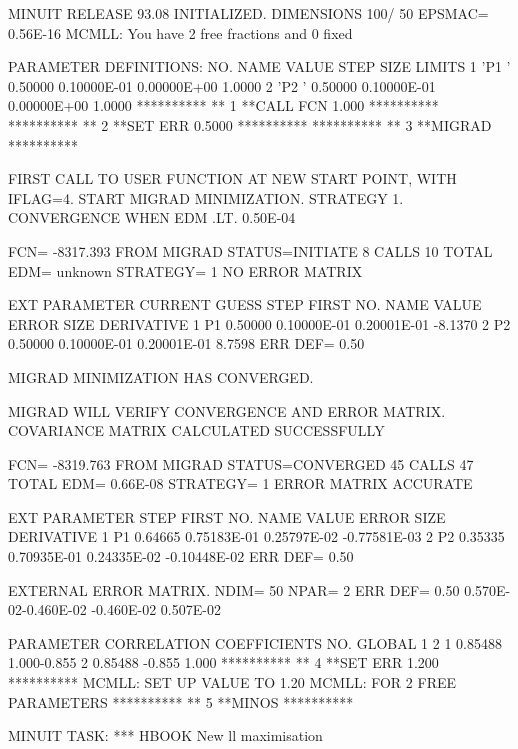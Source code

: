 \begin{changebar}
\begin{Listing}
{  MINUIT RELEASE 93.08  INITIALIZED.   DIMENSIONS 100/ 50  EPSMAC=  0.56E-16
 MCMLL: You have  2 free fractions and  0 fixed
 
 PARAMETER DEFINITIONS:
    NO.   NAME         VALUE      STEP SIZE      LIMITS
     1 'P1        '   0.50000      0.10000E-01    0.00000E+00   1.0000
     2 'P2        '   0.50000      0.10000E-01    0.00000E+00   1.0000
 **********
 **    1 **CALL FCN   1.000
 **********
 **********
 **    2 **SET ERR  0.5000
 **********
 **********
 **    3 **MIGRAD
 **********
 
 FIRST CALL TO USER FUNCTION AT NEW START POINT, WITH IFLAG=4.
 START MIGRAD MINIMIZATION.  STRATEGY 1.  CONVERGENCE WHEN EDM .LT. 0.50E-04
 
 FCN=  -8317.393     FROM MIGRAD    STATUS=INITIATE       8 CALLS       10 TOTAL
                     EDM= unknown      STRATEGY= 1      NO ERROR MATRIX
 
  EXT PARAMETER               CURRENT GUESS       STEP         FIRST
  NO.   NAME        VALUE          ERROR          SIZE      DERIVATIVE
   1      P1       0.50000       0.10000E-01   0.20001E-01   -8.1370
   2      P2       0.50000       0.10000E-01   0.20001E-01    8.7598
                               ERR DEF=  0.50
 
 MIGRAD MINIMIZATION HAS CONVERGED.
 
 MIGRAD WILL VERIFY CONVERGENCE AND ERROR MATRIX.
 COVARIANCE MATRIX CALCULATED SUCCESSFULLY
 
 FCN=  -8319.763     FROM MIGRAD    STATUS=CONVERGED     45 CALLS       47 TOTAL
                     EDM=  0.66E-08    STRATEGY= 1      ERROR MATRIX ACCURATE
 
  EXT PARAMETER                                   STEP         FIRST
  NO.   NAME        VALUE          ERROR          SIZE      DERIVATIVE
   1      P1       0.64665       0.75183E-01   0.25797E-02  -0.77581E-03
   2      P2       0.35335       0.70935E-01   0.24335E-02  -0.10448E-02
                               ERR DEF=  0.50
 
 EXTERNAL ERROR MATRIX.    NDIM=  50    NPAR=  2    ERR DEF=  0.50
  0.570E-02-0.460E-02
 -0.460E-02 0.507E-02
 
 PARAMETER  CORRELATION COEFFICIENTS
       NO.  GLOBAL     1     2
        1  0.85488  1.000-0.855
        2  0.85488 -0.855 1.000
 **********
 **    4 **SET ERR   1.200
 **********
 MCMLL: SET UP VALUE TO  1.20
 MCMLL: FOR  2 FREE PARAMETERS
 **********
 **    5 **MINOS
 **********
 
 MINUIT TASK: *** HBOOK New ll maximisation
 
}
\end{Listing}
\end{changebar}
